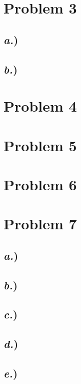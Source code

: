 \documentclass{article}
\begin{document}
\section*{Problem 3}

\subsection*{\textit{a.})}
\subsection*{\textit{b.})}



\section*{Problem 4}




\section*{Problem 5}






\section*{Problem 6}






\section*{Problem 7}


\subsection*{\textit{a.})}
\subsection*{\textit{b.})}
\subsection*{\textit{c.})}
\subsection*{\textit{d.})}
\subsection*{\textit{e.})}



\end{document}
